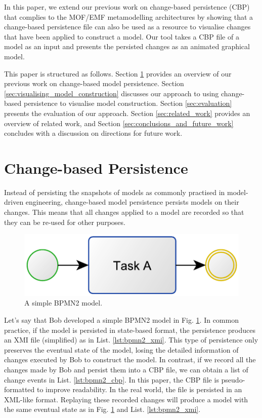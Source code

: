 \documentclass[conference]{IEEEtran}
\begin{document}
In this paper, we extend our previous work on change-based persistence (CBP) that complies to the MOF/EMF metamodelling architectures
\cite{DBLP:conf/models/YohannisKP17,yohannis2018towards,DBLP:conf/models/YohannisRPK18,yohannis2018efficient}
by showing that a change-based persistence file can also be used as a resource to visualise changes that have been applied to construct a model. 
Our tool takes a CBP file of a model as an input and presents the persisted changes as an animated graphical model. 

This paper is structured as follows. 
Section \ref{sec:change-based_persistence} provides an overview of our previous work on change-based model persistence. 
Section \ref{sec:visualising_model_construction} discusses our approach to using change-based persistence to visualise model construction. 
Section \ref{sec:evaluation} presents the evaluation of our approach. 
Section \ref{sec:related_work} provides an overview of related work, and
Section \ref{sec:conclusions_and_future_work} concludes with a discussion on directions for future work.

\section{Change-based Persistence}
\label{sec:change-based_persistence}

Instead of persisting the snapshots of models as commonly practised in model-driven engineering, change-based model persistence persists models on their changes. 
This means that all changes applied to a model are recorded so that they can be re-used for other purposes. 

\begin{figure}[h]
    \centering
    \includegraphics[width=0.5\linewidth]{bpmn2}
    \caption{A simple BPMN2 model.}
    \label{fig:bpmn2}
\end{figure}

Let's say that Bob developed a simple BPMN2 model in Fig. \ref{fig:bpmn2}. In common practice, if the model is persisted in state-based format, 
the persistence produces an XMI file (simplified) as in List. \ref{lst:bpmn2_xmi}. This type of persistence only preserves the eventual state of the model,  
losing the detailed information of changes executed by Bob to construct the model. In contrast, 
if we record all the changes made by Bob and persist them into a CBP file, we can obtain a list of change events in List. \ref{lst:bpmn2_cbp}.
In this paper, the CBP file is pseudo-formatted to improve readability. In the real world, the file is persisted in an XML-like format.
Replaying these recorded changes will produce a model with the same eventual state as in Fig. \ref{fig:bpmn2} and List. \ref{lst:bpmn2_xmi}.
\end{document}
